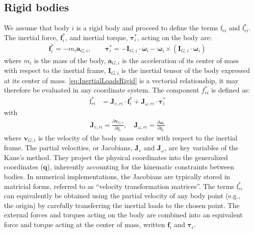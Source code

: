 \documentclass[wes, manuscript]{copernicus}
\renewcommand{\v}[1]{\boldsymbol{#1}}
\newcommand{\m}[1]{\boldsymbol{#1}}
\newcommand{\kanef}{\mathrm{f}}
\begin{document}
\subsection{Rigid bodies}
\label{sec:rigidbodies}
We assume that body $i$ is a rigid body and proceed to define the terms $\kanef_{ri}$ and $\kanef_{ri}^*$.
The inertial force, $\v{f}_i^*$, and inertial torque, $\v{\tau}_i^*$, acting on the body are:
\begin{align}
     \v{f}_i^* = - m_i \v{a}_{G,i},
         \qquad
     \v{\tau}_i^* = -\m{I}_{G,i} \cdot \v{\dot{\omega}}_i - \v{\omega} _i \times( \m{I}_{G,i}\cdot \v{\omega}_i)
      \label{eq:InertialLoadsRigid}
\end{align}
where $m_i$ is the mass of the body, $\v{a}_{G,i}$ is the acceleration of its center of mass with respect to the inertial frame, $\m{I}_{G,i}$ is the inertial tensor of the body expressed at its center of mass. 
\autoref{eq:InertialLoadsRigid} is a vectorial relationship, it may therefore be evaluated in any coordinate system.
The component $f_{ri}^*$ is defined as:
\begin{align}
   \kanef_{ri}^* &= \v{J}_{v,ri} \cdot \v{f}_i^*  + \v{J}_{\omega,ri} \cdot \v{\tau}_i^*
    \label{eq:frstarRigid}
\end{align}
with
\begin{align}
    \v{J}_{v,ri} = \frac{\partial \v{v}_{G,i}}{\partial \dot{q}_r}
    ,\quad
    \v{J}_{\omega,ri} = \frac{\partial \v{\omega}_{i}}{\partial \dot{q}_r}
\end{align}
where $\v{v}_{G,i}$ is the velocity of the body mass center with respect to the inertial frame.
The partial velocities, or Jacobians, $\v{J}_v$ and $\v{J}_\omega$, are key variables of the Kane's method.
They project the physical coordinates into the generalized coordinates ($\v{q}$), inherently accounting for the kinematic constraints between bodies.
In numerical implementations, the Jacobians are typically stored in matricial forms, referred to as ``velocity transformation matrices''.
The terms $\kanef_{ri}^*$ can equivalently be obtained using the partial velocity of any body point (e.g., the origin) by carefully transferring the inertial loads to the chosen point.
The external forces and torques acting on the body are combined into an equivalent force and torque acting at the center of mass, written $\v{f}_i$  and $\v{\tau}_i$. 
\end{document}
